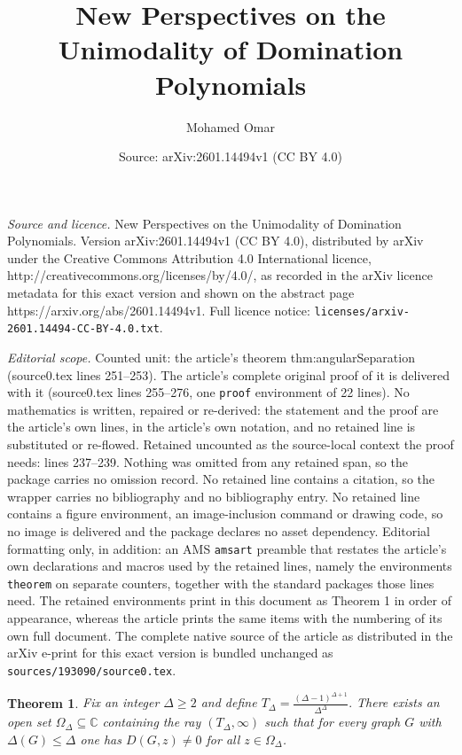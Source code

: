 \documentclass[10pt,a4paper]{amsart}
\title{New Perspectives on the Unimodality of Domination Polynomials}
\author{Mohamed Omar}
\date{Source: arXiv:2601.14494v1 (CC BY 4.0)}
\newtheorem{theorem}{Theorem}
\newcommand{\bbC}{\mathbb{C}}
\begin{document}
\maketitle

\noindent\emph{Source and licence.} New Perspectives on the Unimodality of Domination Polynomials. Version arXiv:2601.14494v1 (CC BY 4.0), distributed by arXiv under the Creative Commons Attribution 4.0 International licence, http://creativecommons.org/licenses/by/4.0/, as recorded in the arXiv licence metadata for this exact version and shown on the abstract page https://arxiv.org/abs/2601.14494v1. Full licence notice: \texttt{licenses/arxiv-2601.14494-CC-BY-4.0.txt}.\par\smallskip

\noindent\textit{Editorial scope.} Counted unit: the article's theorem thm:angularSeparation (source0.tex lines 251--253). The article's complete original proof of it is delivered with it (source0.tex lines 255--276, one \texttt{proof} environment of 22 lines). No mathematics is written, repaired or re-derived: the statement and the proof are the article's own lines, in the article's own notation, and no retained line is substituted or re-flowed.  Retained uncounted as the source-local context the proof needs: lines 237--239.  Nothing was omitted from any retained span, so the package carries no omission record.  No retained line contains a citation, so the wrapper carries no bibliography and no bibliography entry.  No retained line contains a figure environment, an image-inclusion command or drawing code, so no image is delivered and the package declares no asset dependency.  Editorial formatting only, in addition: an AMS \texttt{amsart} preamble that restates the article's own declarations and macros used by the retained lines, namely the environments \texttt{theorem} on separate counters, together with the standard packages those lines need.  The retained environments print in this document as Theorem 1 in order of appearance, whereas the article prints the same items with the numbering of its own full document.  The complete native source of the article as distributed in the arXiv e-print for this exact version is bundled unchanged as \texttt{sources/193090/source0.tex}.
\begin{theorem}\label{thm:rayZeroFree}
Fix an integer $\Delta\ge 2$ and define $T_{\Delta}=\frac{(\Delta-1)^{\Delta+1}}{\Delta^{\Delta}}.$ There exists an open set $\Omega_{\Delta}\subseteq \bbC$ containing the ray $(T_{\Delta},\infty)$ such that for every graph $G$ with $\Delta(G)\le \Delta$ one has $D(G,z)\neq 0$ for all $z\in \Omega_{\Delta}$.
\end{theorem}
\end{document}
